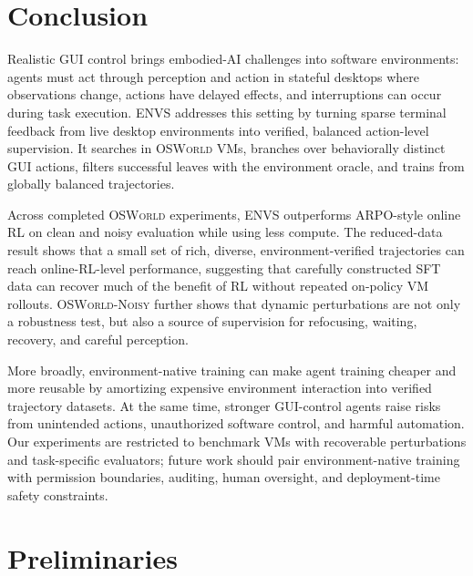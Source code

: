 \documentclass[11pt]{article}
\begin{document}
\section{Conclusion}

Realistic GUI control brings embodied-AI challenges into software
environments: agents must act through perception and action in stateful
desktops where observations change, actions have delayed effects, and
interruptions can occur during task execution. \textsc{ENVS} addresses
this setting by turning sparse terminal feedback from live desktop
environments into verified, balanced action-level supervision. It
searches in \textsc{OSWorld} VMs, branches over behaviorally distinct
GUI actions, filters successful leaves with the environment oracle, and
trains from globally balanced trajectories.

Across completed \textsc{OSWorld} experiments, \textsc{ENVS}
outperforms ARPO-style online RL on clean and noisy evaluation while
using less compute. The reduced-data result shows that a
small set of rich, diverse, environment-verified trajectories can reach
online-RL-level performance, suggesting that carefully constructed SFT
data can recover much of the benefit of RL without repeated on-policy
VM rollouts. \textsc{OSWorld-Noisy} further shows that dynamic
perturbations are not only a robustness test, but also a source of
supervision for refocusing, waiting, recovery, and careful perception.

More broadly, environment-native training can make agent
training cheaper and more reusable by amortizing expensive environment
interaction into verified trajectory datasets. At the same time,
stronger GUI-control agents raise risks from unintended actions,
unauthorized software control, and harmful automation. Our experiments
are restricted to benchmark VMs with recoverable perturbations and
task-specific evaluators; future work should pair environment-native
training with permission boundaries, auditing, human oversight, and
deployment-time safety constraints.

\clearpage

{\small


}

\clearpage
\appendix

\section{Preliminaries}
\end{document}

